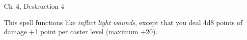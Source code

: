 
\begin{description*}
\item[Level:] Clr 4, Destruction 4
\end{description*}

This spell functions like \textit{inflict light wounds}, except that you deal 4d8
points of damage +1 point per caster level (maximum +20).
